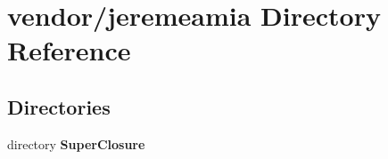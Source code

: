 \section{vendor/jeremeamia Directory Reference}
\label{dir_f4dced85d18dc720dd5c0cfcdef742e4}
\subsection*{Directories}
\begin{DoxyCompactItemize}
\item 
directory {\bf Super\+Closure}
\end{DoxyCompactItemize}
